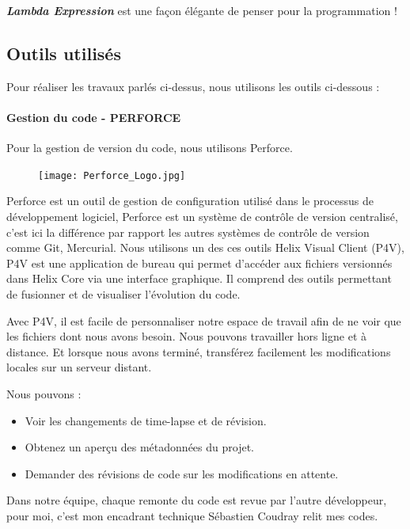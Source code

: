    \par \textit{\textbf{Lambda Expression}} est une façon élégante de penser pour la programmation ! 
    
    
    \subsection{Outils utilisés}
    Pour réaliser les travaux parlés ci-dessus, nous utilisons les outils ci-dessous : 
    \paragraph{Gestion du code - PERFORCE}
    Pour la gestion de version du code, nous utilisons Perforce.
    \begin{figure}[H]
    	\flushleft
    	\texttt{[image: Perforce\_Logo.jpg]}
    	\label{fig:Perforce_Logo}
    \end{figure}
    \par Perforce est un outil de gestion de configuration utilisé dans le processus de développement logiciel, Perforce est un système de contrôle de version centralisé, c'est ici la différence par rapport les autres systèmes de contrôle de version comme Git, Mercurial. Nous utilisons un des ces outils Helix Visual Client (P4V), P4V est une application de bureau qui permet d’accéder aux fichiers versionnés dans Helix Core via une interface graphique. Il comprend des outils permettant de fusionner et de visualiser l'évolution du code.
    \par Avec P4V, il est facile de personnaliser notre espace de travail afin de ne voir que les fichiers dont nous avons besoin. Nous pouvons travailler hors ligne et à distance. Et lorsque nous avons terminé, transférez facilement les modifications locales sur un serveur distant. 
    \par Nous pouvons :
    \begin{itemize}
    	\item Voir les changements de time-lapse et de révision. 
    	\item Obtenez un aperçu des métadonnées du projet.
    	\item Demander des révisions de code sur les modifications en attente.
    \end{itemize} 
    \par Dans notre équipe, chaque remonte du code est revue par l'autre développeur, pour moi, c'est mon encadrant technique Sébastien Coudray relit mes codes. 
    
